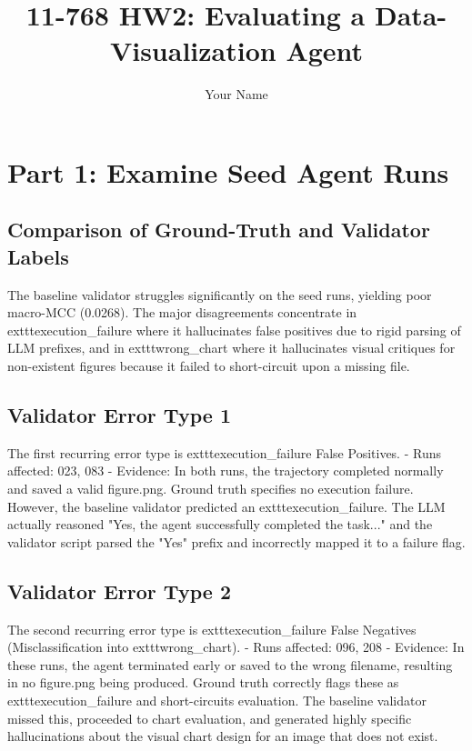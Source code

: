 \documentclass[11pt]{article}
\title{11-768 HW2: Evaluating a Data-Visualization Agent}
\author{Your Name}
\date{}
\begin{document}
\maketitle

\section{Part 1: Examine Seed Agent Runs}

\subsection{Comparison of Ground-Truth and Validator Labels}
The baseline validator struggles significantly on the seed runs, yielding poor macro-MCC (0.0268). The major disagreements concentrate in 	exttt{execution\_failure} where it hallucinates false positives due to rigid parsing of LLM prefixes, and in 	exttt{wrong\_chart} where it hallucinates visual critiques for non-existent figures because it failed to short-circuit upon a missing file.

\subsection{Validator Error Type 1}
The first recurring error type is 	exttt{execution\_failure} False Positives.
- Runs affected: 023, 083
- Evidence: In both runs, the trajectory completed normally and saved a valid figure.png. Ground truth specifies no execution failure. However, the baseline validator predicted an 	exttt{execution\_failure}. The LLM actually reasoned "Yes, the agent successfully completed the task..." and the validator script parsed the "Yes" prefix and incorrectly mapped it to a failure flag.

\subsection{Validator Error Type 2}
The second recurring error type is 	exttt{execution\_failure} False Negatives (Misclassification into 	exttt{wrong\_chart}).
- Runs affected: 096, 208
- Evidence: In these runs, the agent terminated early or saved to the wrong filename, resulting in no figure.png being produced. Ground truth correctly flags these as 	exttt{execution\_failure} and short-circuits evaluation. The baseline validator missed this, proceeded to chart evaluation, and generated highly specific hallucinations about the visual chart design for an image that does not exist.
\end{document}
